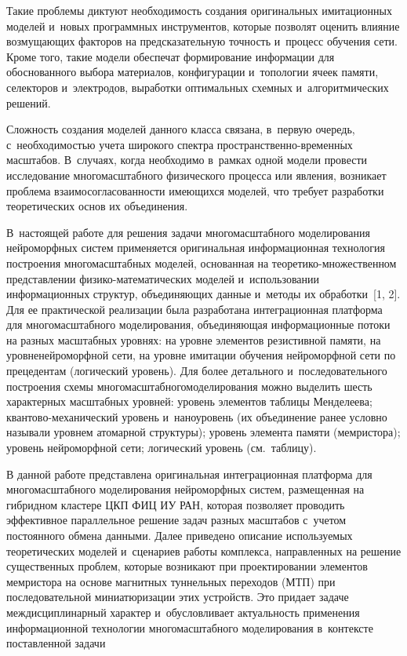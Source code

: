 \begin{multicols}{2}
Такие 
проблемы диктуют необходимость создания оригинальных имитационных 
моделей и~новых программных инструментов, которые позволят оценить влияние 
возмущающих факторов на предсказательную точность и~процесс обучения сети. 
Кроме того, такие модели обеспечат формирование информации для 
обоснованного выбора материалов, конфигурации и~топологии ячеек памяти, 
селекторов и~электродов, выработки оптимальных схемных и~алгоритмических 
решений. 

Сложность создания моделей данного класса связана, в~первую 
очередь, с~необходимостью учета широкого спектра 
про\-стран\-ст\-вен\-но-вре\-мен\-н$\acute{\mbox{ы}}$х масштабов. В~случаях, когда необходимо в~рамках одной модели 
провести исследование многомасштабного физического процесса или явления, 
возникает проб\-ле\-ма взаимосогласованности име\-ющих\-ся моделей, что требует 
разработки теоретических основ их объединения. 

В~настоящей работе для 
решения задачи многомасштабного моделирования нейроморфных сис\-тем 
применяется оригинальная информационная технология построения 
многомасштабных моделей, основанная на теоретико-множественном 
пред\-став\-ле\-нии фи\-зи\-ко-ма\-те\-ма\-ти\-че\-ских моделей и~использовании 
информационных структур, объ\-еди\-ня\-ющих данные и~методы их обработки~[1, 
2]. Для ее практической реализации была разработана интеграционная платформа 
для многомасштабного моделирования, объединяющая информационные потоки 
на разных масштабных уровнях: на уровне элементов резистивной памяти, на 
уровне\linebreak нейроморфной сети, на уровне имитации обучения нейроморфной сети по 
прецедентам (логический уровень). Для более детального и~последовательного 
построения схемы многомасштабного\linebreak моделирования можно выделить шесть 
характерных масштабных уровней: уровень элементов таб\-ли\-цы Менделеева; 
кван\-то\-во-ме\-ха\-ни\-че\-ский уровень и~наноуровень (их объединение ранее 
условно называли уровнем атомарной структуры); уровень элемента памяти 
(мемристора); уровень нейроморфной сети; логический уровень (см.\ таблицу).
 
    В данной работе представлена оригинальная интеграционная платформа для 
многомасштабного моделирования нейроморфных систем, размещенная на 
гибридном кластере ЦКП ФИЦ ИУ РАН, которая позволяет проводить 
эффективное параллельное решение задач разных масштабов с~учетом 
постоянного обмена данными. Далее приведено описание используемых 
теоретических моделей и~сценариев работы комплекса, на\-прав\-лен\-ных на 
решение существенных проблем, которые возникают при проектировании 
элементов мем\-ристора на основе магнитных туннельных пе\-реходов (МТП) при 
последовательной миниатюризации этих устройств. Это придает задаче 
\mbox{междисциплинарный} характер и~обусловливает актуальность применения 
информационной технологии многомасштабного моделирования в~контексте 
поставленной задачи


\end{multicols}
